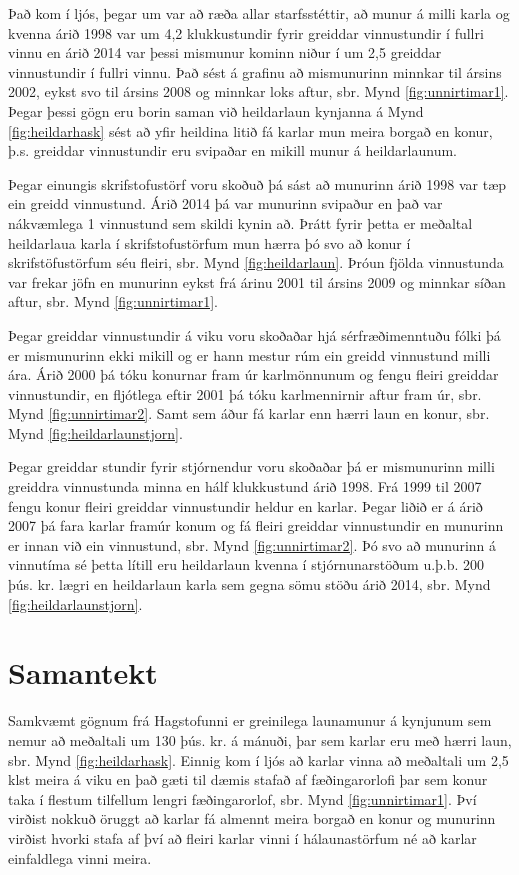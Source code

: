 \documentclass[12pt, git, final]{rureport}
\begin{document}
Það kom í ljós, þegar um var að ræða allar starfsstéttir, að munur á milli karla og kvenna árið 1998 var um 4,2 klukkustundir fyrir greiddar vinnustundir í fullri vinnu en árið 2014 var þessi mismunur kominn niður í um 2,5 greiddar vinnustundir í fullri vinnu.
Það sést á grafinu að mismunurinn minnkar til ársins 2002, eykst svo til ársins 2008 og minnkar loks aftur, sbr. Mynd \ref{fig:unnirtimar1}. Þegar þessi gögn eru borin saman við heildarlaun kynjanna á Mynd \ref{fig:heildarhask} sést að yfir heildina litið fá karlar mun meira borgað en konur, þ.s. greiddar vinnustundir eru svipaðar en mikill munur á heildarlaunum.

Þegar einungis skrifstofustörf voru skoðuð þá sást að munurinn árið 1998 var tæp ein greidd vinnustund. Árið 2014 þá var munurinn svipaður en það var nákvæmlega 1 vinnustund sem skildi kynin að. Þrátt fyrir þetta er meðaltal heildarlaua karla í skrifstofustörfum mun hærra þó svo að konur í skrifstöfustörfum séu fleiri, sbr. Mynd \ref{fig:heildarlaun}. Þróun fjölda vinnustunda var frekar jöfn en munurinn eykst frá árinu 2001  til ársins 2009 og minnkar síðan aftur, sbr. Mynd \ref{fig:unnirtimar1}.

Þegar greiddar vinnustundir á viku voru skoðaðar hjá sérfræðimenntuðu fólki þá er mismunurinn ekki mikill og er hann mestur rúm ein greidd vinnustund milli ára. Árið 2000 þá tóku konurnar fram úr karlmönnunum og fengu fleiri greiddar vinnustundir, en fljótlega eftir 2001 þá tóku karlmennirnir aftur fram úr, sbr. Mynd \ref{fig:unnirtimar2}. Samt sem áður fá karlar enn hærri laun en konur, sbr. Mynd \ref{fig:heildarlaunstjorn}.

Þegar greiddar stundir fyrir stjórnendur voru skoðaðar þá er mismunurinn milli greiddra vinnustunda minna en hálf klukkustund árið 1998. Frá 1999 til 2007 fengu konur fleiri greiddar vinnustundir heldur en karlar. Þegar liðið er á árið 2007 þá fara karlar framúr konum og fá fleiri greiddar vinnustundir en munurinn er innan við ein vinnustund, sbr. Mynd \ref{fig:unnirtimar2}. Þó svo að munurinn á vinnutíma sé þetta lítill eru heildarlaun kvenna í stjórnunarstöðum u.þ.b. 200 þús. kr. lægri en heildarlaun karla sem gegna sömu stöðu árið 2014, sbr. Mynd \ref{fig:heildarlaunstjorn}.

\section{Samantekt}

Samkvæmt gögnum frá Hagstofunni\cite{H} er greinilega launamunur á kynjunum sem nemur að meðaltali um 130 þús. kr. á mánuði, þar sem karlar eru með hærri laun, sbr. Mynd \ref{fig:heildarhask}. Einnig kom í ljós að karlar vinna að meðaltali um 2,5 klst meira á viku en það gæti til dæmis stafað af fæðingarorlofi þar sem konur taka í flestum tilfellum lengri fæðingarorlof, sbr. Mynd \ref{fig:unnirtimar1}. Því virðist nokkuð öruggt að karlar fá almennt meira borgað en konur og munurinn virðist hvorki stafa af því að fleiri karlar vinni í hálaunastörfum né að karlar einfaldlega vinni meira.
\end{document}
